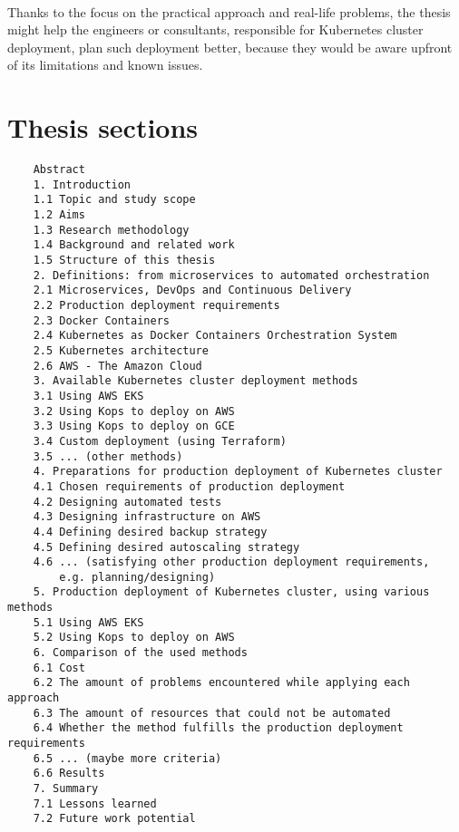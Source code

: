 \documentclass[12pt]{article}
\begin{document}
\paragraph{}
Thanks to the focus on the practical approach and real-life problems, the thesis might help the engineers or consultants, responsible for Kubernetes cluster deployment, plan such deployment better, because they would be aware upfront of its limitations and known issues.


\section{Thesis sections}

\begin{lstlisting}
    Abstract
    1. Introduction
    1.1 Topic and study scope
    1.2 Aims
    1.3 Research methodology
    1.4 Background and related work
    1.5 Structure of this thesis
    2. Definitions: from microservices to automated orchestration
    2.1 Microservices, DevOps and Continuous Delivery
    2.2 Production deployment requirements
    2.3 Docker Containers
    2.4 Kubernetes as Docker Containers Orchestration System
    2.5 Kubernetes architecture
    2.6 AWS - The Amazon Cloud
    3. Available Kubernetes cluster deployment methods
    3.1 Using AWS EKS
    3.2 Using Kops to deploy on AWS
    3.3 Using Kops to deploy on GCE
    3.4 Custom deployment (using Terraform)
    3.5 ... (other methods)
    4. Preparations for production deployment of Kubernetes cluster
    4.1 Chosen requirements of production deployment
    4.2 Designing automated tests
    4.3 Designing infrastructure on AWS
    4.4 Defining desired backup strategy
    4.5 Defining desired autoscaling strategy
    4.6 ... (satisfying other production deployment requirements,
        e.g. planning/designing)
    5. Production deployment of Kubernetes cluster, using various methods
    5.1 Using AWS EKS
    5.2 Using Kops to deploy on AWS
    6. Comparison of the used methods
    6.1 Cost
    6.2 The amount of problems encountered while applying each approach
    6.3 The amount of resources that could not be automated
    6.4 Whether the method fulfills the production deployment requirements
    6.5 ... (maybe more criteria)
    6.6 Results
    7. Summary
    7.1 Lessons learned
    7.2 Future work potential    
\end{lstlisting}
\end{document}
